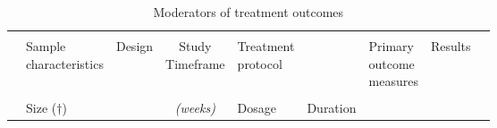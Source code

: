 
\begin{table*}[]
\small
  \centering
   \caption{Moderators of treatment outcomes}
  \label{tab:m}
\begin{tabular}{lllclclll}
 \hline
 &&&&&&&\\
& 
\pbox{2cm}{Sample\\characteristics} &
\pbox{1cm}{Design\\} &
\pbox{2cm}{Study\\Timeframe} &
\pbox{1.5cm}{Treatment\\protocol} &
 & 
\pbox{2cm}{Primary\\outcome\\measures} & 
\pbox{2cm}{Results\\} \\
&&&&&&&&\\
&
Size ($\dagger$)
&
&
\emph{(weeks)}&
Dosage &
Duration &
&
\\
 \hline


\end{tabular}
\end{table*}
